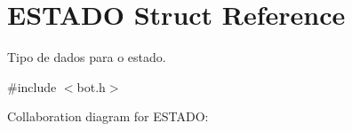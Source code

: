 \hypertarget{structESTADO}{}\section{E\+S\+T\+A\+DO Struct Reference}
\label{structESTADO}


Tipo de dados para o estado.  




{\ttfamily \#include $<$bot.\+h$>$}



Collaboration diagram for E\+S\+T\+A\+DO\+:
